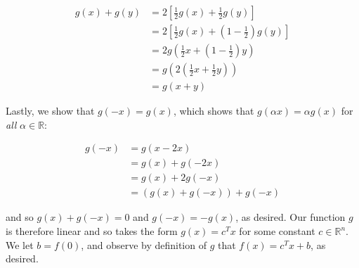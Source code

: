\begin{solution}
  \begin{align*}
    g(x) + g(y) &= 2 \left[ \frac{1}{2} g(x) + \frac{1}{2} g(y) \right] \\
                &= 2 \left[ \frac{1}{2} g(x) + \left(1 - \frac{1}{2}\right) g(y) \right] \\
                &= 2g\left( \frac{1}{2}x + \left(1 - \frac{1}{2}\right)y \right) \\
                &= g\left(2 \left( \frac{1}{2}x + \frac{1}{2}y \right) \right) \\
                &= g(x + y)
  \end{align*}

  Lastly, we show that $g(-x) = g(x)$, which shows that $g(\alpha x) = \alpha g(x)$ for \textit{all} $\alpha \in 
  \mathbb{R}$:

  \begin{align*}
    g(-x) &= g(x - 2x) \\
          &= g(x) + g(-2x) \\
          &= g(x) + 2g(-x) \\
          &= \left(g(x) + g(-x)\right) + g(-x)
  \end{align*}

  and so $g(x) + g(-x) = 0$ and $g(-x) = -g(x)$, as desired. Our function $g$ is therefore linear and so takes the form 
  $g(x) = c^T x$ for some constant $c \in \mathbb{R}^n$. We let $b = f(0)$, and observe by definition of $g$ that 
  $f(x) = c^T x + b$, as desired.
  
  \ \\
\end{solution}